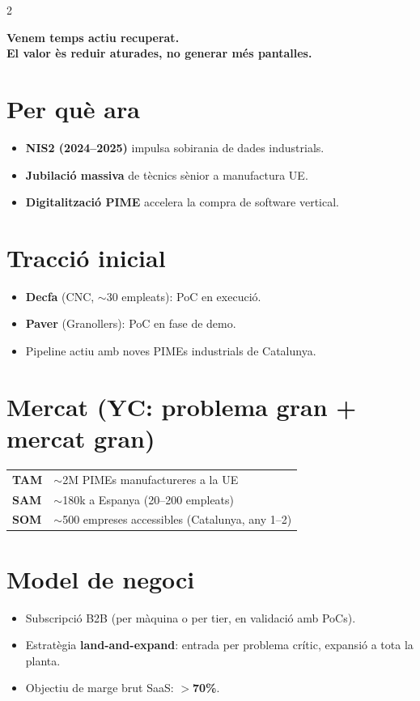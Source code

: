 \documentclass[10pt,a4paper]{article}
\begin{document}
\begin{multicols}{2}
\begin{center}
\colorbox{softgreen}{\parbox{0.94\linewidth}{\centering\small\bfseries
Venem temps actiu recuperat.\\
El valor \`es reduir aturades, no generar m\'es pantalles.
}}
\end{center}

\section{Per qu\`e ara}
\begin{itemize}[leftmargin=1em,itemsep=1pt,topsep=2pt]
\item \textbf{NIS2 (2024--2025)} impulsa sobirania de dades industrials.
\item \textbf{Jubilaci\'o massiva} de t\`ecnics s\`enior a manufactura UE.
\item \textbf{Digitalitzaci\'o PIME} accelera la compra de software vertical.
\end{itemize}

\section{Tracci\'o inicial}
\begin{itemize}[leftmargin=1em,itemsep=1pt,topsep=2pt]
\item \textbf{Decfa} (CNC, $\sim$30 empleats): PoC en execuci\'o.
\item \textbf{Paver} (Granollers): PoC en fase de demo.
\item Pipeline actiu amb noves PIMEs industrials de Catalunya.
\end{itemize}

\columnbreak

\section{Mercat (YC: problema gran + mercat gran)}
\small
\renewcommand{\arraystretch}{1.15}
\begin{tabularx}{0.96\linewidth}{lX}
\toprule
\textbf{TAM} & $\sim$2M PIMEs manufactureres a la UE \\
\textbf{SAM} & $\sim$180k a Espanya (20--200 empleats) \\
\textbf{SOM} & $\sim$500 empreses accessibles (Catalunya, any 1--2) \\
\bottomrule
\end{tabularx}
\normalsize

\section{Model de negoci}
\begin{itemize}[leftmargin=1em,itemsep=1pt,topsep=2pt]
\item Subscripci\'o B2B (per m\`aquina o per tier, en validaci\'o amb PoCs).
\item Estrat\`egia \textbf{land-and-expand}: entrada per problema cr\'itic, expansi\'o a tota la planta.
\item Objectiu de marge brut SaaS: \textbf{$>$70\%}.
\end{itemize}


\end{multicols}
\end{document}
